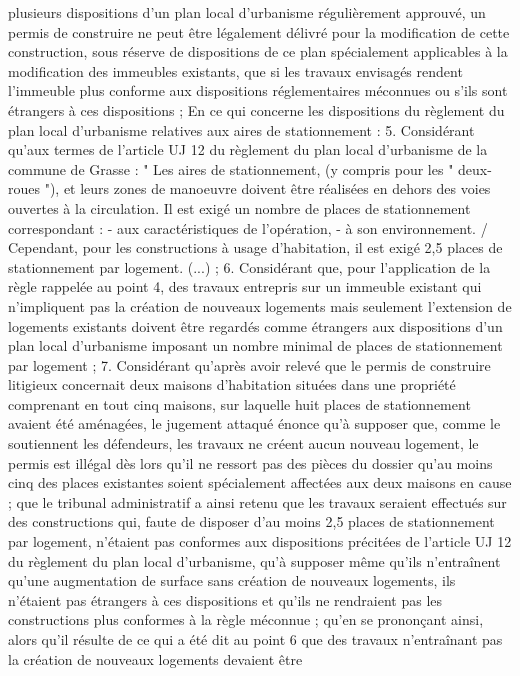 \documentclass[11pt,a4paper]{report}
\begin{document}
	plusieurs dispositions d'un plan local d'urbanisme régulièrement approuvé, un permis de construire ne peut être
	légalement délivré pour la modification de cette construction, sous réserve de dispositions de ce plan
	spécialement applicables à la modification des immeubles existants, que si les travaux envisagés rendent
	l'immeuble plus conforme aux dispositions réglementaires méconnues ou s'ils sont étrangers à ces dispositions ;
	En ce qui concerne les dispositions du règlement du plan local d'urbanisme relatives aux aires de stationnement
	:
	5. Considérant qu'aux termes de l'article UJ 12 du règlement du plan local d'urbanisme de la commune de
	Grasse : " Les aires de stationnement, (y compris pour les " deux-roues "), et leurs zones de manoeuvre doivent
	être réalisées en dehors des voies ouvertes à la circulation. Il est exigé un nombre de places de stationnement
	correspondant : - aux caractéristiques de l'opération, - à son environnement. / Cependant, pour les
	constructions à usage d'habitation, il est exigé 2,5 places de stationnement par logement. (...) ;
	6. Considérant que, pour l'application de la règle rappelée au point 4, des travaux entrepris sur un immeuble
	existant qui n'impliquent pas la création de nouveaux logements mais seulement l'extension de logements
	existants doivent être regardés comme étrangers aux dispositions d'un plan local d'urbanisme imposant un
	nombre minimal de places de stationnement par logement ;
	7. Considérant qu'après avoir relevé que le permis de construire litigieux concernait deux maisons d'habitation
	situées dans une propriété comprenant en tout cinq maisons, sur laquelle huit places de stationnement avaient
	été aménagées, le jugement attaqué énonce qu'à supposer que, comme le soutiennent les défendeurs, les travaux
	ne créent aucun nouveau logement, le permis est illégal dès lors qu'il ne ressort pas des pièces du dossier qu'au
	moins cinq des places existantes soient spécialement affectées aux deux maisons en cause ; que le tribunal
	administratif a ainsi retenu que les travaux seraient effectués sur des constructions qui, faute de disposer d'au
	moins 2,5 places de stationnement par logement, n'étaient pas conformes aux dispositions précitées de l'article
	UJ 12 du règlement du plan local d'urbanisme, qu'à supposer même qu'ils n'entraînent qu'une augmentation de
	surface sans création de nouveaux logements, ils n'étaient pas étrangers à ces dispositions et qu'ils ne rendraient
	pas les constructions plus conformes à la règle méconnue ; qu'en se prononçant ainsi, alors qu'il résulte de ce
	qui a été dit au point 6 que des travaux n'entraînant pas la création de nouveaux logements devaient être
\end{document}
